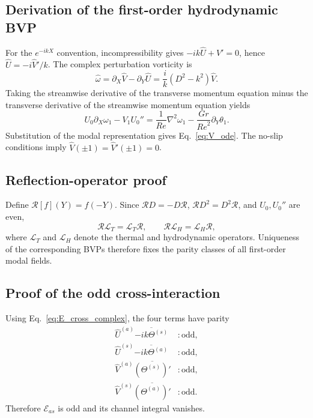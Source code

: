 \documentclass[12pt,a4paper]{article}
\newcommand{\Rey}{\mathit{Re}}
\newcommand{\Grr}{\mathit{Gr}}
\begin{document}
\subsection{Derivation of the first-order hydrodynamic BVP}
\label{app:hydro_derivation}

For the $e^{-ikX}$ convention, incompressibility gives
$-ik\widehat U+\widehat V'=0$, hence $\widehat U=-i\widehat V'/k$. The complex perturbation vorticity is
\begin{equation}
  \widehat\omega=\partial_X\widehat V-\partial_Y\widehat U
  =\frac{i}{k}(D^2-k^2)\widehat V.
\end{equation}
Taking the streamwise derivative of the transverse momentum equation minus the transverse derivative of the
streamwise momentum equation yields
\begin{equation}
  U_0\partial_X\omega_1-V_1U_0''
  =\frac{1}{\Rey}\nabla^2\omega_1
  -\frac{\Grr}{\Rey^2}\partial_Y\theta_1.
\end{equation}
Substitution of the modal representation gives Eq.~\eqref{eq:V_ode}. The no-slip conditions imply
$\widehat V(\pm1)=\widehat V'(\pm1)=0$.

\subsection{Reflection-operator proof}
\label{app:reflection}

Define $\mathcal R[f](Y)=f(-Y)$. Since $\mathcal RD=-D\mathcal R$, $\mathcal RD^2=D^2\mathcal R$, and
$U_0,U_0''$ are even,
\begin{equation}
  \mathcal R\mathcal L_T=\mathcal L_T\mathcal R,
  \qquad
  \mathcal R\mathcal L_H=\mathcal L_H\mathcal R,
\end{equation}
where $\mathcal L_T$ and $\mathcal L_H$ denote the thermal and hydrodynamic operators. Uniqueness of
the corresponding BVPs therefore fixes the parity classes of all first-order modal fields.

\subsection{Proof of the odd cross-interaction}
\label{app:cross_proof}

Using Eq.~\eqref{eq:E_cross_complex}, the four terms have parity
\begin{align}
\widehat U^{(a)}\overline{-ik\Theta^{(s)}} &: \text{odd},\\
\widehat U^{(s)}\overline{-ik\Theta^{(a)}} &: \text{odd},\\
\widehat V^{(a)}\overline{(\Theta^{(s)})'} &: \text{odd},\\
\widehat V^{(s)}\overline{(\Theta^{(a)})'} &: \text{odd}.
\end{align}
Therefore $\mathcal E_{as}$ is odd and its channel integral vanishes.
\end{document}
